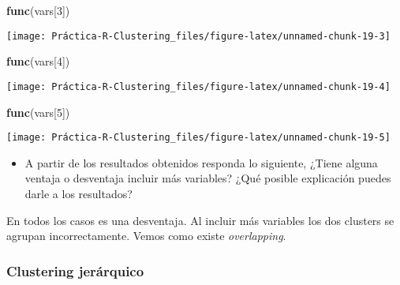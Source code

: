 \documentclass[
]{article}
\newenvironment{Shaded}{\begin{snugshade}}{\end{snugshade}}
\newcommand{\DecValTok}[1]{\textcolor[rgb]{0.00,0.00,0.81}{#1}}
\newcommand{\KeywordTok}[1]{\textcolor[rgb]{0.13,0.29,0.53}{\textbf{#1}}}
\newcommand{\NormalTok}[1]{#1}
\providecommand{\tightlist}{%
  \setlength{\itemsep}{0pt}\setlength{\parskip}{0pt}}
\begin{document}
\begin{Shaded}
\begin{Highlighting}[]
\KeywordTok{func}\NormalTok{(vars[}\DecValTok{3}\NormalTok{])}
\end{Highlighting}
\end{Shaded}

\begin{center}\texttt{[image: Práctica-R-Clustering\_files/figure-latex/unnamed-chunk-19-3]} \end{center}

\begin{Shaded}
\begin{Highlighting}[]
\KeywordTok{func}\NormalTok{(vars[}\DecValTok{4}\NormalTok{])}
\end{Highlighting}
\end{Shaded}

\begin{center}\texttt{[image: Práctica-R-Clustering\_files/figure-latex/unnamed-chunk-19-4]} \end{center}

\begin{Shaded}
\begin{Highlighting}[]
\KeywordTok{func}\NormalTok{(vars[}\DecValTok{5}\NormalTok{])}
\end{Highlighting}
\end{Shaded}

\begin{center}\texttt{[image: Práctica-R-Clustering\_files/figure-latex/unnamed-chunk-19-5]} \end{center}

\begin{itemize}
\tightlist
\item
  A partir de los resultados obtenidos responda lo siguiente, ¿Tiene
  alguna ventaja o desventaja incluir más variables? ¿Qué posible
  explicación puedes darle a los resultados?
\end{itemize}

En todos los casos es una desventaja. Al incluir más variables los dos
clusters se agrupan incorrectamente. Vemos como existe
\emph{overlapping}.

\hypertarget{clustering-jeruxe1rquico}{%
\subsubsection{Clustering jerárquico}\label{clustering-jeruxe1rquico}}
\end{document}
